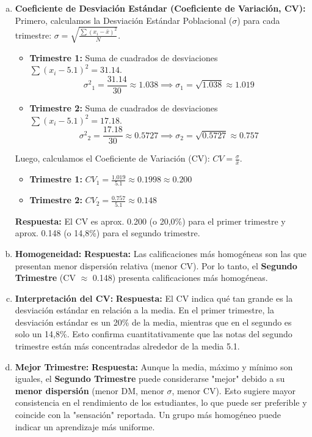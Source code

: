 \documentclass[10pt, a4paper]{article}
\newcommand{\mean}[1]{\ensuremath{\bar{#1}}} %
\newcommand{\pstdev}{\ensuremath{\sigma}} %
\newcommand{\pvar}{\ensuremath{\sigma^2}} %
\begin{document}
\begin{enumerate}[a.]
    \item \textbf{Coeficiente de Desviación Estándar (Coeficiente de Variación, CV):}
    Primero, calculamos la Desviación Estándar Poblacional (\pstdev) para cada trimestre: $\pstdev = \sqrt{\frac{\sum (x_i - \mean{x})^2}{N}}$.
    \begin{itemize}[nosep]
        \item \textbf{Trimestre 1:} Suma de cuadrados de desviaciones $\sum (x_i - \num{5,1})^2 = \num{31,14}$.
          \[ \pvar_1 = \frac{\num{31,14}}{30} \approx \num{1,038} \implies \pstdev_1 = \sqrt{\num{1,038}} \approx \num{1,019} \]
        \item \textbf{Trimestre 2:} Suma de cuadrados de desviaciones $\sum (x_i - \num{5,1})^2 = \num{17,18}$.
          \[ \pvar_2 = \frac{\num{17,18}}{30} \approx \num{0,5727} \implies \pstdev_2 = \sqrt{\num{0,5727}} \approx \num{0,757} \]
    \end{itemize}
    Luego, calculamos el Coeficiente de Variación (CV): $CV = \frac{\pstdev}{\mean{x}}$.
    \begin{itemize}[nosep]
        \item \textbf{Trimestre 1:} $CV_1 = \frac{\num{1,019}}{\num{5,1}} \approx \num{0,1998} \approx \num{0,200}$
        \item \textbf{Trimestre 2:} $CV_2 = \frac{\num{0,757}}{\num{5,1}} \approx \num{0,148}$
    \end{itemize}
    \textbf{Respuesta:} El CV es aprox. \num{0,200} (o 20,0\%) para el primer trimestre y aprox. \num{0,148} (o 14,8\%) para el segundo trimestre.

    \item \textbf{Homogeneidad:}
    \textbf{Respuesta:} Las calificaciones más homogéneas son las que presentan menor dispersión relativa (menor CV). Por lo tanto, el \textbf{Segundo Trimestre} (CV $\approx$ \num{0,148}) presenta calificaciones más homogéneas.

    \item \textbf{Interpretación del CV:}
    \textbf{Respuesta:} El CV indica qué tan grande es la desviación estándar en relación a la media. En el primer trimestre, la desviación estándar es un 20\% de la media, mientras que en el segundo es solo un 14,8\%. Esto confirma cuantitativamente que las notas del segundo trimestre están más concentradas alrededor de la media \num{5,1}.

    \item \textbf{Mejor Trimestre:}
    \textbf{Respuesta:} Aunque la media, máximo y mínimo son iguales, el \textbf{Segundo Trimestre} puede considerarse "mejor" debido a su \textbf{menor dispersión} (menor DM, menor \pstdev, menor CV). Esto sugiere mayor consistencia en el rendimiento de los estudiantes, lo que puede ser preferible y coincide con la "sensación" reportada. Un grupo más homogéneo puede indicar un aprendizaje más uniforme.


\end{enumerate}
\end{document}
